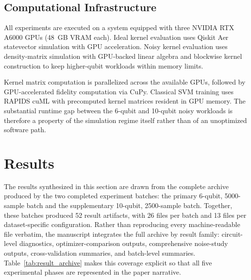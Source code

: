 \documentclass{ieeeaccess}
\begin{document}
\subsection{Computational Infrastructure}
\label{sec:infrastructure}

All experiments are executed on a system equipped with three NVIDIA RTX A6000 GPUs (48~GB VRAM each). Ideal kernel evaluation uses Qiskit Aer statevector simulation with GPU acceleration. Noisy kernel evaluation uses density-matrix simulation with GPU-backed linear algebra and blockwise kernel construction to keep higher-qubit workloads within memory limits.

Kernel matrix computation is parallelized across the available GPUs, followed by GPU-accelerated fidelity computation via CuPy. Classical SVM training uses RAPIDS cuML with precomputed kernel matrices resident in GPU memory. The substantial runtime gap between the 6-qubit and 10-qubit noisy workloads is therefore a property of the simulation regime itself rather than of an unoptimized software path.

\section{Results}
\label{sec:results}

The results synthesized in this section are drawn from the complete archive produced by the two completed experiment batches: the primary 6-qubit, 5000-sample batch and the supplementary 10-qubit, 2500-sample batch. Together, these batches produced 52 result artifacts, with 26 files per batch and 13 files per dataset-specific configuration. Rather than reproducing every machine-readable file verbatim, the manuscript integrates the full archive by result family: circuit-level diagnostics, optimizer-comparison outputs, comprehensive noise-study outputs, cross-validation summaries, and batch-level summaries. Table~\ref{tab:result_archive} makes this coverage explicit so that all five experimental phases are represented in the paper narrative.
\end{document}
